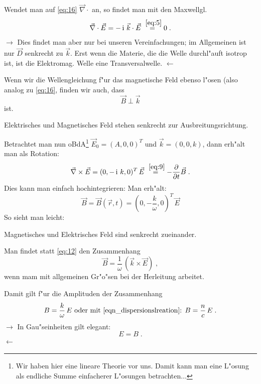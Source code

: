 \documentclass[twoside,a4paper]{book}
\newcommand{\Ve}[1]{\ensuremath{\vec{#1}}}
\newcommand{\Rot}{\ensuremath{\Ve \nabla \times }}
\newcommand{\Div}{\ensuremath{\Ve \nabla \cdot }}
\newcommand{\I}{\ensuremath{\operatorname{i}}}
\newenvironment*{Einschub}[0]{$\rightarrow$ \indent}{$\leftarrow$}
\begin{document}
Wendet man auf \eqref{eq:16} $\Div$ an, so findet man mit den Maxwellgl.
\begin{equation*}
   \Div \Vec E = - \I \, \vec k \cdot \vec E \stackrel{~\eqref{eq:5}}{=} 0 \;.
\end{equation*}
\begin{Einschub}
   Dies findet man aber nur bei unseren Vereinfachungen; im
   Allgemeinen ist nur $\vec D$ senkrecht zu $\vec k$. Erst wenn die
   Materie, die die Welle durchl"auft isotrop ist, ist die
   Elektromag. Welle eine Transversalwelle.
\end{Einschub}

Wenn wir die Wellengleichung f"ur das magnetische Feld ebenso l"osen
(also analog zu \eqref{eq:16}, finden wir auch, dass 
\begin{equation*}
   \vec B \perp \vec k
\end{equation*}
ist. 
\begin{Wichtig}
   Elektrisches und Magnetisches Feld stehen senkrecht zur
   Ausbreitungsrichtung.
\end{Wichtig}
Betrachtet man nun oBdA\footnote{Wir haben hier eine lineare Theorie
  vor uns. Damit kann man eine L"osung als endliche Summe einfacherer
  L"osungen betrachten...} $\vec E_0 = (A,0,0)^T$ und $\vec k = (0, 0, k)$, dann erh"alt man als
Rotation:
\begin{equation*}
   \Rot \vec E =  (0, -\I \, k, 0)^T \, \vec E
   \stackrel{~\eqref{eq:9}}{=} - \frac{\partial }{\partial t}\vec B \;.
\end{equation*}
Dies kann man einfach hochintegrieren: Man erh"alt:
\begin{equation}
   \label{eq:12}
   \vec B = \vec B(\vec r,t) = (0, -\frac{k}{\omega}, 0)^T \, \vec E
\end{equation}
So sieht man leicht:
\begin{Wichtig}
   Magnetisches und Elektrisches Feld sind senkrecht zueinander.
\end{Wichtig}
Man findet statt \eqref{eq:12} den Zusammenhang
\begin{equation}
   \label{eqn_zsht_b-e}
   \boxed{ \vec B = \frac{1}{\omega} \, \left ( \vec k \times \vec E
     \right ) } \;,
\end{equation}
wenn mam mit allgemeinen Gr"o"sen bei der Herleitung arbeitet.

Damit gilt f"ur die Amplituden der Zusammenhang
\begin{equation}
   \label{eq:13}
   B = \frac{k}{\omega} \, E \text{ oder mit
     \eqref{eqn_dispersionslreation}: } 
B = \frac{n}{c} \, E \;.
\end{equation}
\begin{Einschub}
   In Gau"seinheiten gilt elegant:
   \begin{equation*}
      E = B \;.
   \end{equation*}
\end{Einschub}
\end{document}
